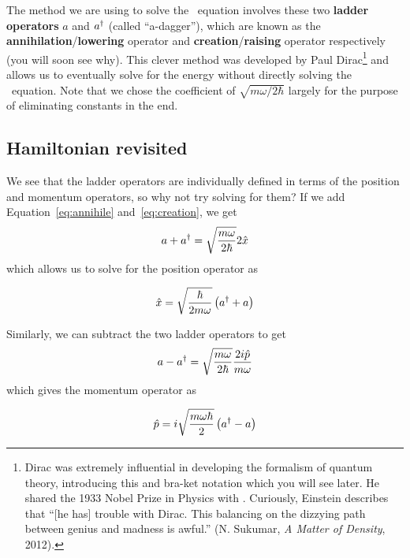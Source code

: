 The method we are using to solve the \Sch\ equation involves these two \textbf{ladder operators} $a$ and $a^{\dagger}$ (called ``a-dagger''), which are known as the \textbf{annihilation}/\textbf{lowering} operator and \textbf{creation}/\textbf{raising} operator respectively (you will soon see why). This clever method was developed by Paul Dirac\footnote{Dirac was extremely influential in developing the formalism of quantum theory, introducing this and bra-ket notation which you will see later. He shared the 1933 Nobel Prize in Physics with \Sch. Curiously, Einstein describes that ``[he has] trouble with Dirac. This balancing on the dizzying path between genius and madness is awful.'' (N. Sukumar, \emph{A Matter of Density}, 2012).} and allows us to eventually solve for the energy without directly solving the \Sch\ equation. Note that we chose the coefficient of $\sqrt{m\omega/2\hbar}$ largely for the purpose of eliminating constants in the end.


\subsection{Hamiltonian revisited}
We see that the ladder operators are individually defined in terms of the position and momentum operators, so why not try solving for them? If we add Equation~\ref{eq:annihile} and~\ref{eq:creation}, we get 
\begin{equation*}
	a + a^{\dagger} = \sqrt{\frac{m\omega}{2\hbar}}2\hat{x}
\end{equation*}
which allows us to solve for the position operator as
\begin{tcolorbox}[title = Position operator] \vspace{-2ex}
	\begin{equation}
		\hat{x} = \sqrt{\frac{\hbar}{2m\omega}}\left(a^{\dagger} + a \right) \label{eq:x-op}
	\end{equation}
\end{tcolorbox}

Similarly, we can subtract the two ladder operators to get
\begin{equation*}
	a - a^{\dagger} = \sqrt{\frac{m\omega}{2\hbar}} \frac{2i\hat{p}}{m\omega}
\end{equation*}
which gives the momentum operator as 
\begin{tcolorbox}[title = Momentum operator] \vspace{-2ex}
	\begin{equation}
	\hat{p} = i\sqrt{\frac{m\omega\hbar}{2}}\left(a^{\dagger} - a \right) \label{eq:p-op}
	\end{equation}
\end{tcolorbox}


